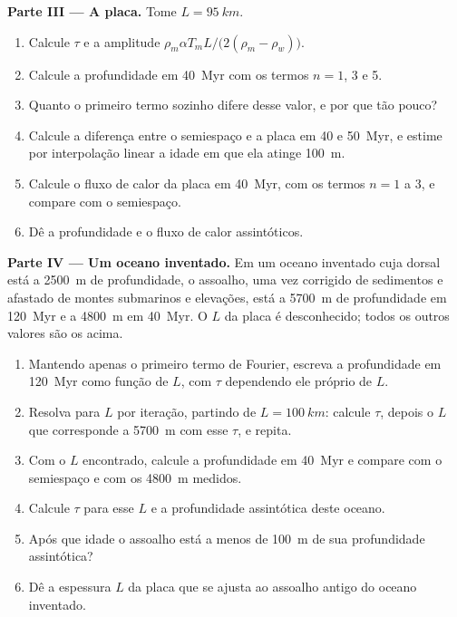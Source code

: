 \begin{problem}
\medskip\noindent\textbf{Parte III --- A placa.} Tome $L = \qty{95}{km}$.
\begin{enumerate}[resume]
  \item Calcule $\tau$ e a amplitude $\rho_m\alpha T_mL/\bigl(2(\rho_m -
        \rho_w)\bigr)$.
  \item Calcule a profundidade em \qty{40}{Myr} com os termos $n = 1$, 3 e 5.
  \item Quanto o primeiro termo sozinho difere desse valor, e por que tão
        pouco?
  \item Calcule a diferença entre o semiespaço e a placa em 40 e
        \qty{50}{Myr}, e estime por interpolação linear a idade em que
        ela atinge \qty{100}{m}.
  \item Calcule o fluxo de calor da placa em \qty{40}{Myr}, com os termos
        $n = 1$ a 3, e compare com o semiespaço.
  \item Dê a profundidade e o fluxo de calor assintóticos.
\end{enumerate}

\medskip\noindent\textbf{Parte IV --- Um oceano inventado.} Em um oceano inventado
cuja dorsal está a \qty{2500}{m} de profundidade, o assoalho, uma vez corrigido
de sedimentos e afastado de montes submarinos e elevações, está a \qty{5700}{m}
de profundidade em \qty{120}{Myr} e a \qty{4800}{m} em \qty{40}{Myr}. O $L$ da
placa é desconhecido; todos os outros valores são os acima.
\begin{enumerate}[resume]
  \item Mantendo apenas o primeiro termo de Fourier, escreva a profundidade em
        \qty{120}{Myr} como função de $L$, com $\tau$ dependendo ele próprio de
        $L$.
  \item Resolva para $L$ por iteração, partindo de $L = \qty{100}{km}$:
        calcule $\tau$, depois o $L$ que corresponde a \qty{5700}{m} com esse
        $\tau$, e repita.
  \item Com o $L$ encontrado, calcule a profundidade em \qty{40}{Myr} e compare
        com o semiespaço e com os \qty{4800}{m} medidos.
  \item Calcule $\tau$ para esse $L$ e a profundidade assintótica deste oceano.
  \item Após que idade o assoalho está a menos de \qty{100}{m} de sua
        profundidade assintótica?
  \item Dê a espessura $L$ da placa que se ajusta ao assoalho antigo do
        oceano inventado.
\end{enumerate}
\end{problem}
